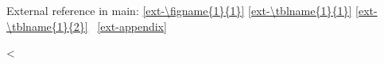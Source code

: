 \documentclass[12pt, lettersize]{article}
\begin{document}

\newpage



\newpage







External reference in main:
\ref{ext-\figname{1}{1}}
\ref{ext-\tblname{1}{1}}
\ref{ext-\tblname{1}{2}}
\APPENDIX~\ref{ext-appendix}

\newpage
<%

\newpage
\appendix


\end{document}
